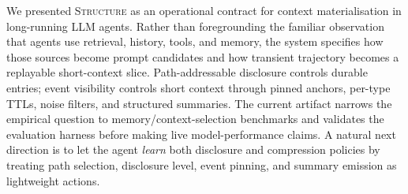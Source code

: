 We presented \textsc{Structure} as an operational contract for context
materialisation in long-running LLM agents. Rather than foregrounding
the familiar observation that agents use retrieval, history, tools, and
memory, the system specifies how those sources become prompt candidates
and how transient trajectory becomes a replayable short-context slice.
Path-addressable disclosure controls durable entries; event visibility
controls short context through pinned anchors, per-type TTLs, noise
filters, and structured summaries. The current artifact narrows the
empirical question to memory/context-selection benchmarks and validates
the evaluation harness before making live model-performance claims. A
natural next direction is to let the agent \emph{learn} both disclosure
and compression policies by treating path selection, disclosure level,
event pinning, and summary emission as lightweight actions.
